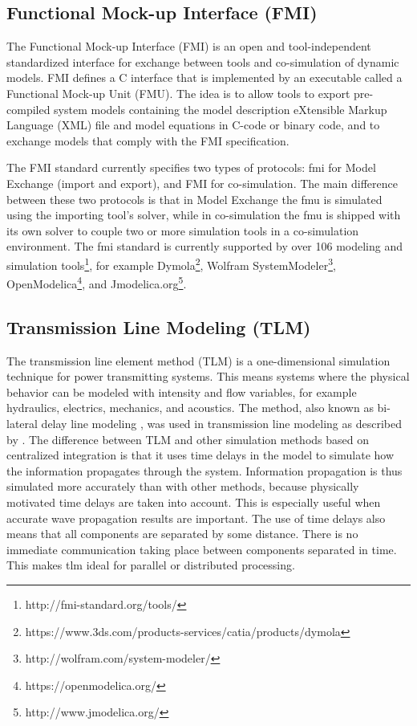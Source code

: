 \subsection{Functional Mock-up Interface (FMI)}
\label{sec:fmi}

The Functional Mock-up Interface (FMI) \cite{fmi,fmiblochwitz} is an open and tool-independent standardized interface for exchange between tools and co-simulation of dynamic models. FMI defines a C interface that is implemented by an executable called a Functional Mock-up Unit (FMU). The idea is to allow tools to export pre-compiled system models containing the model description eXtensible Markup Language (XML) file and model equations in C-code or binary code, and to exchange models that comply with the FMI specification. 

The FMI standard currently specifies two types of protocols: \acrshort{fmi} for Model Exchange (import and export), and FMI for co-simulation. The main difference between these two protocols is that in Model Exchange the \acrshort{fmu} is simulated using the importing tool's solver, while in co-simulation the \acrshort{fmu} is shipped with its own solver to couple two or more simulation tools in a co-simulation environment. 
The \acrshort{fmi} standard is currently supported by over 106 modeling and simulation tools\footnote{http://fmi-standard.org/tools/}, for example Dymola\footnote{https://www.3ds.com/products-services/catia/products/dymola}, Wolfram SystemModeler\footnote{http://wolfram.com/system-modeler/}, OpenModelica\footnote{https://openmodelica.org/}, and Jmodelica.org\footnote{http://www.jmodelica.org/}.

\subsection{Transmission Line Modeling (TLM)}
\label{sec:tlm}

The transmission line element method (TLM) \cite{tlmkurs90,tlmkurs99,tlmcogan,tlmjohns} is a one-dimensional simulation technique for power transmitting systems. This means systems where the physical behavior can be modeled with intensity and flow variables, for example hydraulics, electrics, mechanics, and acoustics. The method, also known as bi-lateral delay line modeling \cite{tlmauslander}, was used in transmission line modeling as described by \cite{tlmjohns}. The difference between TLM and other simulation methods based on centralized integration is that it uses time delays in the model to simulate how the information propagates through the system. Information propagation is thus simulated more accurately than with other methods, because physically motivated time delays are taken into account. This is especially useful when accurate wave propagation results are important. The use of time delays also means that all components are separated by some distance. There is no immediate communication taking place between components separated in time. This makes \acrshort{tlm} ideal for parallel or distributed processing.

